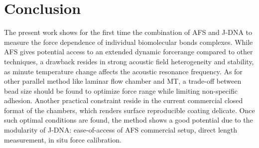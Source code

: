 \documentclass{biophys-new}
\begin{document}
%
%
%

\section*{Conclusion}

The present work shows for the first time the combination of AFS and J-DNA to measure the force dependence of individual biomolecular bonds complexes. While AFS gives potential access to an extended dynamic forcerange compared to other techniques, a drawback resides in strong acoustic field heterogeneity and stability, as minute temperature change affects the acoustic resonance frequency. As for other parallel method like laminar flow chamber and MT, a trade-off between bead size should be found to optimize force range while limiting non-specific adhesion. Another practical constraint reside in the current commercial closed format of the chambers, which renders surface reproducible coating delicate. Once such optimal conditions are found, the method shows a good potential due to the modularity of J-DNA: ease-of-access of AFS commercial setup, direct length measurement, in situ force calibration.
\end{document}
